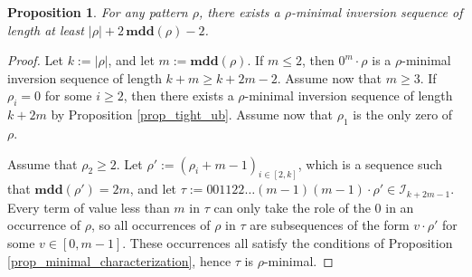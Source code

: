 \documentclass[a4paper,11pt]{article}
\newtheorem{prop}[thm]{Proposition}
\theoremstyle{definition}
\theoremstyle{remark}
\newcommand{\I}{\mathcal{I}}
\newcommand{\mdd}{\mathbf{mdd}}
\begin{document}
\begin{prop} \label{prop_min_max_length}
    For any pattern $\rho$, there exists a $\rho$-minimal inversion sequence of length at least $|\rho| + 2 \, \mdd(\rho) - 2$.
\end{prop}
\begin{proof}
    Let $k := |\rho|$, and let $m := \mdd(\rho)$. If $m \leq 2$, then $0^m \cdot \rho$ is a $\rho$-minimal inversion sequence of length $k + m \geq k + 2m - 2$. Assume now that $m \geq 3$. If $\rho_i = 0$ for some $i \geq 2$, then there exists a $\rho$-minimal inversion sequence of length $k + 2m$ by Proposition \ref{prop_tight_ub}. Assume now that $\rho_1$ is the only zero of $\rho$.

    Assume that $\rho_2 \geq 2$. Let $\rho' := (\rho_i + m - 1)_{i \in[2,k]}$, which is a sequence such that $\mdd(\rho') = 2m$, and let $\tau := 001122 \dots (m-1) (m-1) \cdot \rho' \in \I_{k+2m-1}$. Every term of value less than $m$ in $\tau$ can only take the role of the 0 in an occurrence of $\rho$, so all occurrences of $\rho$ in $\tau$ are subsequences of the form $v \cdot \rho'$ for some $v \in [0,m-1]$. These occurrences all satisfy the conditions of Proposition \ref{prop_minimal_characterization}, hence $\tau$ is $\rho$-minimal.


\end{proof}
\end{document}

